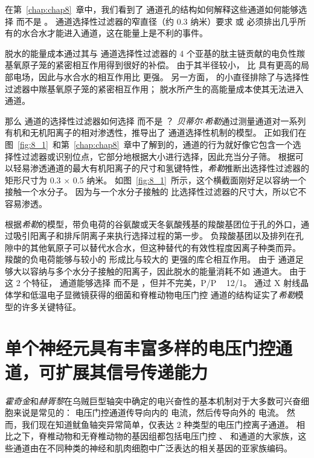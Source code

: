 在第~\ref{chap:chap8}~章中，我们看到了  通道孔的结构如何解释这些通道如何能够选择  而不是 。
 通道选择性过滤器的窄直径（约 0.3 纳米）要求  或  必须排出几乎所有的水合水才能进入通道，这在能量上是不利的事件。


 脱水的能量成本通过其与  通道选择性过滤器的 4 个亚基的肽主链贡献的电负性羰基氧原子笼的紧密相互作用得到很好的补偿。
由于其半径较小， 比  具有更高的局部电场，因此与水合水的相互作用比  更强。
另一方面， 的小直径排除了与选择性过滤器中羰基氧原子笼的紧密相互作用；
 脱水所产生的高能量成本使其无法进入通道。


那么  通道的选择性过滤器如何选择  而不是 ？
\textit{贝蒂尔$\cdot$希勒}通过测量通道对一系列有机和无机阳离子的相对渗透性，推导出了  通道选择性机制的模型。
正如我们在图~\ref{fig:8_1}~和第~\ref{chap:chap8}~章中了解到的，通道的行为就好像它包含一个选择性过滤器或识别位点，它部分地根据大小进行选择，因此充当分子筛。
根据可以轻易渗透通道的最大有机阳离子的尺寸和氢键特性，\textit{希勒}推断出选择性过滤器的矩形尺寸为 0.3 $\times$ 0.5 纳米。
如图~\ref{fig:8_1}~所示，这个横截面刚好足以容纳一个  接触一个水分子。
因为与一个水分子接触的  比选择性过滤器的尺寸大，所以它不容易渗透。


根据\textit{希勒}的模型，带负电荷的谷氨酸或天冬氨酸残基的羧酸基团位于孔的外口，通过吸引阳离子和排斥阴离子来执行选择过程的第一步。
负羧酸基团以及排列在孔隙中的其他氧原子可以替代水合水，但这种替代的有效性程度因离子种类而异。
羧酸的负电荷能够与较小的  形成比与较大的  更强的库仑相互作用。
由于  通道足够大以容纳与多个水分子接触的阳离子，因此脱水的能量消耗不如  通道大。
由于这 2 个特征， 通道能够选择  而不是 ，但并不完美，P/P ~ 12/1。
通过 X 射线晶体学和低温电子显微镜获得的细菌和脊椎动物电压门控  通道的结构证实了\textit{希勒}模型的许多关键特征。



\section{单个神经元具有丰富多样的电压门控通道，可扩展其信号传递能力}

\textit{霍奇金}和\textit{赫胥黎}在乌贼巨型轴突中确定的电兴奋性的基本机制对于大多数可兴奋细胞来说是常见的：
电压门控通道传导向内的  电流，然后传导向外的  电流。
然而，我们现在知道鱿鱼轴突异常简单，仅表达 2 种类型的电压门控离子通道。
相比之下，脊椎动物和无脊椎动物的基因组都包括电压门控 、 和通道的大家族，这些通道由在不同种类的神经和肌肉细胞中广泛表达的相关基因的亚家族编码。


